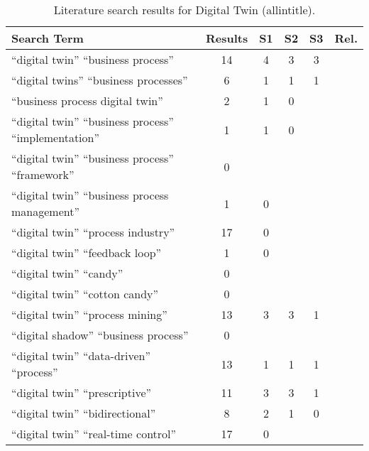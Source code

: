 \begin{table}[h!]
  \begin{center}
    \caption{Literature search results for Digital Twin (allintitle).}
    \label{tab:litsearch-dt}
    \begin{tabular}{l|c|c|c|c|c}
      \textbf{Search Term} & \textbf{Results} & \textbf{S1} & \textbf{S2} & \textbf{S3} & \textbf{Rel.} \\
      \hline
      ``digital twin'' ``business process''                       & 14 & 4 & 3 & 3 &   \\
      ``digital twins'' ``business processes''                    & 6  & 1 & 1 & 1 & \cite{FORNARI2025101477} \\
      ``business process digital twin''                           & 2  & 1 & 0 &   &   \\
      ``digital twin'' ``business process'' ``implementation''    & 1  & 1 & 0 &   &   \\
      ``digital twin'' ``business process'' ``framework''         & 0  &   &   &   &   \\
      ``digital twin'' ``business process management''            & 1  & 0 &   &   &   \\
      ``digital twin'' ``process industry''                       & 17 & 0 &   &   &   \\
      ``digital twin'' ``feedback loop''                          & 1  & 0 &   &   &   \\
      ``digital twin'' ``candy''                                  & 0  &   &   &   &   \\
      ``digital twin'' ``cotton candy''                           & 0  &   &   &   &   \\
      ``digital twin'' ``process mining''                         & 13 & 3 & 3 & 1 & \cite{10716255} \\
      ``digital shadow'' ``business process''                     & 0  &   &   &   &   \\
      ``digital twin'' ``data-driven'' ``process''                & 13 & 1 & 1 & 1 & \cite{8622412} \\
      ``digital twin'' ``prescriptive''                           & 11 & 3 & 3 & 1 & \cite{WALTON2024110241} \\
      ``digital twin'' ``bidirectional''                          & 8  & 2 & 1 & 0 &   \\
      ``digital twin'' ``real-time control''                      & 17 & 0 &   &   &   \\

\end{tabular}
\end{center}
\end{table}
